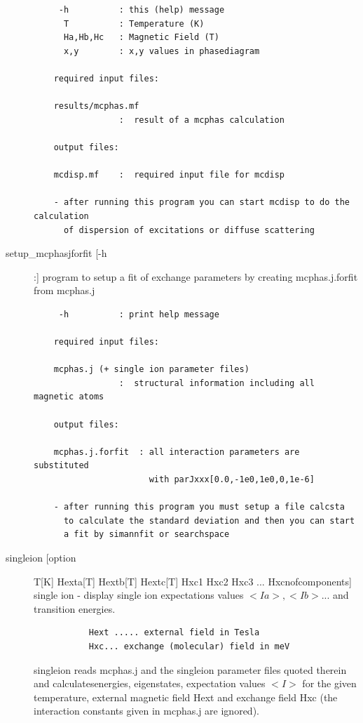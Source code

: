 \begin{description}
\begin{verbatim}
     -h          : this (help) message
      T          : Temperature (K)
      Ha,Hb,Hc   : Magnetic Field (T)
      x,y        : x,y values in phasediagram

    required input files:

    results/mcphas.mf
                 :  result of a mcphas calculation

    output files:

    mcdisp.mf    :  required input file for mcdisp

    - after running this program you can start mcdisp to do the calculation
      of dispersion of excitations or diffuse scattering
\end{verbatim}
\item[\prg   setup\_mcphasjforfit\index{setup\_mcphasjforfit}  [-h]:] program to setup a fit of exchange parameters by   creating mcphas.j.forfit from mcphas.j
                    
\begin{verbatim}
     -h          : print help message

    required input files:

    mcphas.j (+ single ion parameter files)
                 :  structural information including all magnetic atoms

    output files:

    mcphas.j.forfit  : all interaction parameters are substituted
                       with parJxxx[0.0,-1e0,1e0,0,1e-6]

    - after running this program you must setup a file calcsta 
      to calculate the standard deviation and then you can start
      a fit by simannfit or searchspace
\end{verbatim}
\item [\prg singleion\index{singleion} [option] T[K] Hexta[T] Hextb[T] Hextc[T] Hxc1 Hxc2 Hxc3 ... Hxcnofcomponents]
 single ion  - display single ion expectations values $<Ia>, <Ib> $... and transition energies.
\begin{verbatim} 
           Hext ..... external field in Tesla 
           Hxc... exchange (molecular) field in meV   
\end{verbatim}
{\prg singleion} reads {\prg mcphas.j} and the singleion parameter files quoted therein
and calculatesenergies, eigenstates, expectation values $<I>$ for the given
temperature, external magnetic field Hext and exchange field Hxc (the
interaction constants given in mcphas.j are ignored).


\end{description}
